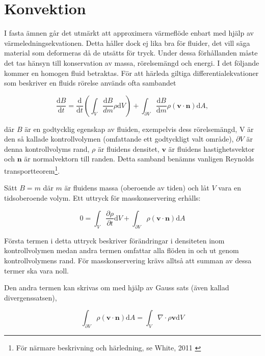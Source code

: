 \section{Konvektion}
\label{section:convection}
I fasta ämnen går det utmärkt att approximera värmeflöde enbart med hjälp av värmeledningsekvationen. Detta håller dock ej lika bra för fluider, det vill säga material som deformeras då de utsätts för tryck. Under dessa förhållanden måste det tas hänsyn till konservation av massa, rörelsemängd och energi. I det följande kommer en homogen fluid betraktas. För att härleda giltiga differentialekvationer som beskriver en fluids rörelse används ofta sambandet

\begin{equation}
\label{eq:convection:reynolds}
\frac{\mathrm{d}B}{\mathrm{d}t} = \frac{\mathrm{d}}{\mathrm{d}t}\left( \int_{V} \frac{\mathrm{d}B}{dm} \rho \mathrm{d}V \right) + \int_{\partial V} \frac{\mathrm{d}B}{\mathrm{d}m} \rho \left( \mathbf{v} \cdot \mathbf{n} \right)\mathrm{d}A,
\end{equation}

där $B$ är en godtycklig egenskap av fluiden, exempelvis dess rörelsemängd, V är den så kallade kontrollvolymen (omfattande ett godtyckligt valt område), $\partial V$ är denna kontrollvolyms rand, $\rho$ är fluidens densitet, $\mathbf{v}$ är fluidens hastighetsvektor och $\mathbf{n}$ är normalvektorn till randen. Detta samband benämns vanligen Reynolds transportteorem\footnote{För närmare beskrivning och härledning, se White, 2011 \cite{white11}}.

Sätt $B = m$ där $m$ är fluidens massa (oberoende av tiden) och låt $V$ vara en tidsoberoende volym. Ett uttryck för masskonservering erhålls:

\begin{equation}
\label{eq:convection:masscon}
0 = \int_V \frac{\partial \rho}{\partial t} \mathrm{d}V + \int_{\partial V} \rho \left( \mathbf{v} \cdot \mathbf{n} \right) \mathrm{d}A
\end{equation}

Första termen i detta uttryck beskriver förändringar i densiteten inom kontrollvolymen medan andra termen omfattar alla flöden in och ut genom kontrollvolymens rand. För masskonservering krävs alltså att summan av dessa termer ska vara noll.

Den andra termen kan skrivas om med hjälp av Gauss sats (även kallad divergenssatsen),

\begin{equation}
\label{eq:convection:gauss}
\int_{\partial V} \rho \left( \mathbf{v} \cdot \mathbf{n} \right) \mathrm{d}A = \int_V \nabla \cdot \rho \mathbf{v} \mathrm{d}V
\end{equation}

